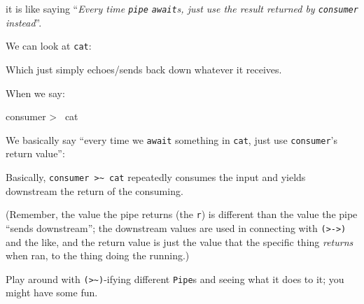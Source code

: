 \documentclass[]{article}
\newenvironment{Shaded}{}{}
\newcommand{\DataTypeTok}[1]{\textcolor[rgb]{0.56,0.13,0.00}{#1}}
\newcommand{\FunctionTok}[1]{\textcolor[rgb]{0.02,0.16,0.49}{#1}}
\newcommand{\KeywordTok}[1]{\textcolor[rgb]{0.00,0.44,0.13}{\textbf{#1}}}
\newcommand{\NormalTok}[1]{#1}
\newcommand{\OtherTok}[1]{\textcolor[rgb]{0.00,0.44,0.13}{#1}}
\begin{document}
it is like saying ``\emph{Every time \texttt{pipe} \texttt{await}s, just use the
result returned by \texttt{consumer} instead}''.

We can look at \texttt{cat}:

\begin{Shaded}
\end{Shaded}

Which just simply echoes/sends back down whatever it receives.

When we say:

\begin{Shaded}
\begin{Highlighting}[]
\NormalTok{consumer }\FunctionTok{>~}\NormalTok{ cat}
\end{Highlighting}
\end{Shaded}

We basically say ``every time we \texttt{await} something in \texttt{cat}, just
use \texttt{consumer}'s return value'':

\begin{Shaded}
\end{Shaded}

Basically, \texttt{consumer\ \textgreater{}\textasciitilde{}\ cat} repeatedly
consumes the input and yields downstream the return of the consuming.

(Remember, the value the pipe returns (the \texttt{r}) is different than the
value the pipe ``sends downstream''; the downstream values are used in
connecting with \texttt{(\textgreater{}-\textgreater{})} and the like, and the
return value is just the value that the specific thing \emph{returns} when ran,
to the thing doing the running.)

Play around with \texttt{(\textgreater{}\textasciitilde{})}-ifying different
\texttt{Pipe}s and seeing what it does to it; you might have some fun.
\end{document}
